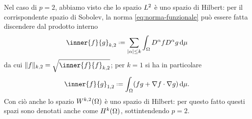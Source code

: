 Nel caso di $p=2$, abbiamo visto che lo spazio $\lclass[2]$ è uno spazio di Hilbert: per il corrispondente spazio di Sobolev, la norma \eqref{eq:norma-funzionale} può essere fatta discendere dal prodotto interno
\begin{equation}
    \inner{f}{g}_{k,2}\defeq
    \sum_{\abs{\alpha}\le k}\int_\Omega D^\alpha fD^\alpha g\,\dd\mu
    \label{eq:prodotto-interno-Wk2}
\end{equation}
da cui $\norm{f}_{k,2}=\sqrt{\inner{f}{f}_{k,2}}$; per $k=1$ si ha in particolare
\begin{equation}
    \inner{f}{g}_{1,2}\defeq
    \int_\Omega (fg+\scalar{\grad f}{\grad g})\,\dd\mu.
    \label{eq:prodotto-interno-W12}
\end{equation}
Con ciò anche lo spazio $\sobW[k,2]{\Omega}$ è uno spazio di Hilbert: per questo fatto questi spazi sono denotati anche come $\sobH[k]{\Omega}$, sottintendendo $p=2$.
